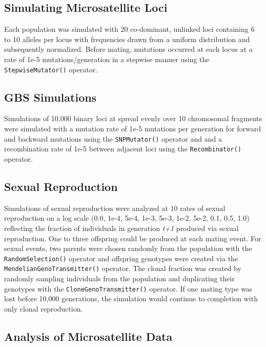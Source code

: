 \documentclass[double,12pt]{beavtex}
\begin{document}
  \subsection{Simulating Microsatellite
  Loci}\label{simulating-microsatellite-loci}
  
  Each population was simulated with 20 co-dominant, unlinked loci
  containing 6 to 10 alleles per locus with frequencies drawn from a
  uniform distribution and subsequently normalized. Before mating,
  mutations occurred at each locus at a rate of 1e-5 mutations/generation
  in a stepwise manner using the \texttt{StepwiseMutator()} operator.
  
  \subsection{GBS Simulations}\label{gbs-simulations}
  
  Simulations of 10,000 binary loci at spread evenly over 10 chromosomal
  fragments were simulated with a mutation rate of 1e-5 mutations per
  generation for forward and backward mutations using the
  \texttt{SNPMutator()} operator and and a recombination rate of 1e-5
  between adjacent loci using the \texttt{Recombinator()} operator.
  
  \subsection{Sexual Reproduction}\label{sexual-reproduction}
  
  Simulations of sexual reproduction were analyzed at 10 rates of sexual
  reproduction on a log scale (0.0, 1e-4, 5e-4, 1e-3, 5e-3, 1e-2, 5e-2,
  0.1, 0.5, 1.0) reflecting the fraction of individuals in generation
  \emph{t+1} produced via sexual reproduction. One to three offspring
  could be produced at each mating event. For sexual events, two parents
  were chosen randomly from the population with the
  \texttt{RandomSelection()} operator and offspring genotypes were created
  via the \texttt{MendelianGenoTransmitter()} operator. The clonal
  fraction was created by randomly sampling individuals from the
  population and duplicating their genotypes with the
  \texttt{CloneGenoTransmitter()} operator. If one mating type was lost
  before 10,000 generations, the simulation would continue to completion
  with only clonal reproduction.
  
  \subsection{Analysis of Microsatellite
  Data}\label{analysis-of-microsatellite-data}
  
\end{document}
